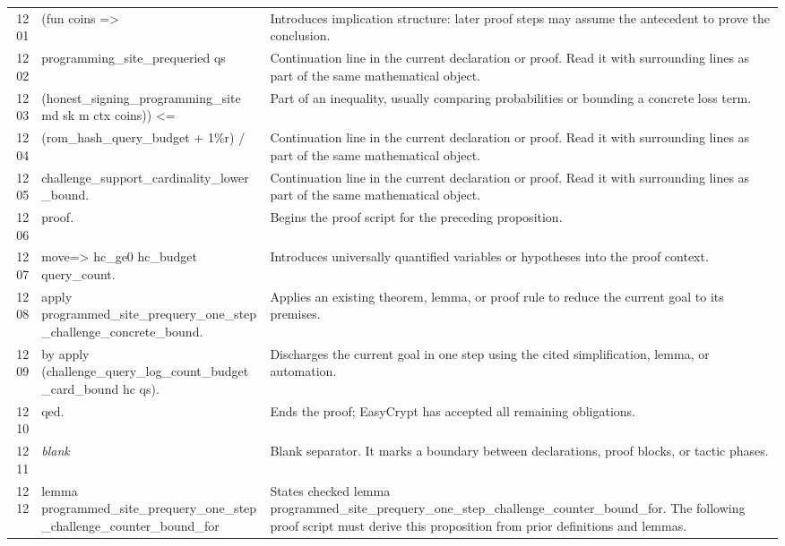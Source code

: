 \documentclass[10pt]{article}
\begin{document}
\begin{longtable}{r L{0.53\textwidth} L{0.37\textwidth}}
1201 & {\ttfamily\scriptsize     (fun coins =>} & Introduces implication structure: later proof steps may assume the antecedent to prove the conclusion. \\
1202 & {\ttfamily\scriptsize       programming\_site\_prequeried qs} & Continuation line in the current declaration or proof.  Read it with surrounding lines as part of the same mathematical object. \\
1203 & {\ttfamily\scriptsize         (honest\_signing\_programming\_site md sk m ctx coins)) <=} & Part of an inequality, usually comparing probabilities or bounding a concrete loss term. \\
1204 & {\ttfamily\scriptsize   (rom\_hash\_query\_budget + 1\%r) /} & Continuation line in the current declaration or proof.  Read it with surrounding lines as part of the same mathematical object. \\
1205 & {\ttfamily\scriptsize     challenge\_support\_cardinality\_lower\_bound.} & Continuation line in the current declaration or proof.  Read it with surrounding lines as part of the same mathematical object. \\
1206 & {\ttfamily\scriptsize proof.} & Begins the proof script for the preceding proposition. \\
1207 & {\ttfamily\scriptsize move=> hc\_ge0 hc\_budget query\_count.} & Introduces universally quantified variables or hypotheses into the proof context. \\
1208 & {\ttfamily\scriptsize apply programmed\_site\_prequery\_one\_step\_challenge\_concrete\_bound.} & Applies an existing theorem, lemma, or proof rule to reduce the current goal to its premises. \\
1209 & {\ttfamily\scriptsize by apply (challenge\_query\_log\_count\_budget\_card\_bound hc qs).} & Discharges the current goal in one step using the cited simplification, lemma, or automation. \\
1210 & {\ttfamily\scriptsize qed.} & Ends the proof; EasyCrypt has accepted all remaining obligations. \\
1211 & {\ttfamily\scriptsize \emph{blank}} & Blank separator.  It marks a boundary between declarations, proof blocks, or tactic phases. \\
1212 & {\ttfamily\scriptsize lemma programmed\_site\_prequery\_one\_step\_challenge\_counter\_bound\_for} & States checked lemma programmed\_site\_prequery\_one\_step\_challenge\_counter\_bound\_for.  The following proof script must derive this proposition from prior definitions and lemmas. \\

\end{longtable}
\end{document}
